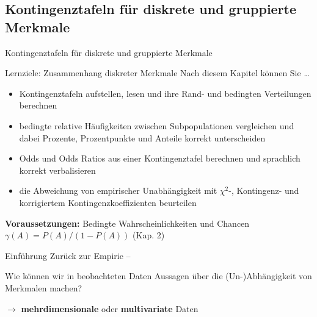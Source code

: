 \documentclass[
  10pt,
  ignorenonframetext,
]{beamer}
\providecommand{\tightlist}{%
  \setlength{\itemsep}{0pt}\setlength{\parskip}{0pt}}
\begin{document}
\hypertarget{kontingenztafeln-fuxfcr-diskrete-und-gruppierte-merkmale}{%
\subsection{Kontingenztafeln für diskrete und gruppierte
Merkmale}\label{kontingenztafeln-fuxfcr-diskrete-und-gruppierte-merkmale}}

\begin{frame}{Kontingenztafeln für diskrete und gruppierte Merkmale}
\scriptsize\normalsize
\end{frame}

\begin{frame}{Lernziele: Zusammenhang diskreter Merkmale}
\protect\hypertarget{lernziele-zusammenhang-diskreter-merkmale}{}
Nach diesem Kapitel können Sie \ldots{}

\begin{itemize}
\tightlist
\item
  Kontingenztafeln aufstellen, lesen und ihre Rand- und bedingten
  Verteilungen berechnen
\item
  bedingte relative Häufigkeiten zwischen Subpopulationen vergleichen
  und dabei Prozente, Prozentpunkte und Anteile korrekt unterscheiden
\item
  Odds und Odds Ratios aus einer Kontingenztafel berechnen und
  sprachlich korrekt verbalisieren
\item
  die Abweichung von empirischer Unabhängigkeit mit \(\chi^2\)-,
  Kontingenz- und korrigiertem Kontingenzkoeffizienten beurteilen
\end{itemize}

\vspace{1em}

\textbf{Voraussetzungen:} Bedingte Wahrscheinlichkeiten und Chancen
\(\gamma(A) = P(A)/(1-P(A))\) (Kap. 2)
\end{frame}

\begin{frame}{Einführung}
\protect\hypertarget{einfuxfchrung-1}{}
Zurück zur Empirie --

Wie können wir in beobachteten Daten Aussagen über die (Un-)Abhängigkeit
von Merkmalen machen?

\(\longrightarrow\) \textbf{mehrdimensionale} oder \textbf{multivariate}
Daten
\end{frame}
\end{document}
